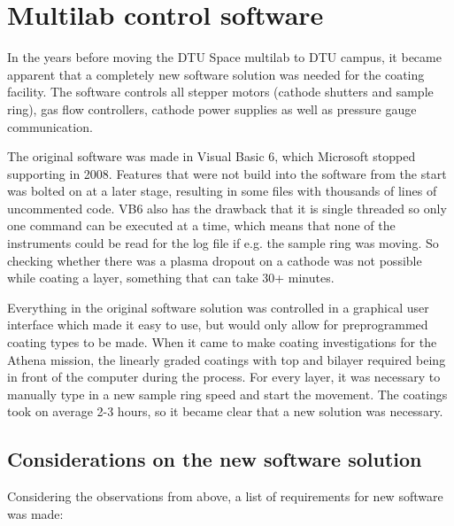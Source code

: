 \chapter{Multilab control software}\label{sec:ml_software}
In the years before moving the DTU Space multilab to DTU campus, it became apparent that a completely new software solution was needed for the coating facility. The software controls all stepper motors (cathode shutters and sample ring), gas flow controllers,  cathode power supplies as well as pressure gauge communication.

The original software was made in Visual Basic 6, which Microsoft stopped supporting in 2008. Features that were not build into the software from the start was bolted on at a later stage, resulting in some files with thousands of lines of uncommented code. VB6 also has the drawback that it is single threaded so only one command can be executed at a time, which means that none of the instruments could be read for the log file if e.g. the sample ring was moving. So checking whether there was a plasma dropout on a cathode was not possible while coating a layer, something that can take 30+ minutes.

Everything in the original software solution was controlled in a graphical user interface which made it easy to use, but would only allow for preprogrammed coating types to be made. When it came to make coating investigations for the Athena mission, the linearly graded coatings with top and bilayer required being in front of the computer during the process. For every layer, it was necessary to manually type in a new sample ring speed and start the movement. The coatings took on average 2-3 hours, so it became clear that a new solution was necessary.

\section{Considerations on the new software solution}
Considering the observations from above, a list of requirements for new software was made:

